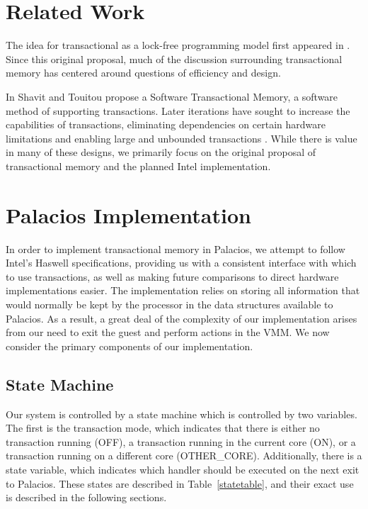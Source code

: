 \documentclass{acm_proc_article-sp}
\begin{document}
\section{Related Work}

The idea for transactional as a lock-free programming model first appeared in
 \cite{Herlihy:1993:TMA:173682.165164}. Since this original proposal, much of
the discussion surrounding transactional memory has centered around questions 
of efficiency and design.

In \cite{Shavit:1995:STM:224964.224987} Shavit and Touitou propose a Software
Transactional Memory, a software method of supporting transactions. Later 
iterations have sought to increase the capabilities of transactions, 
eliminating dependencies on certain hardware limitations and enabling 
large and unbounded transactions 
\cite{Ananian:2006:UTM:1116644.1116670, Hammond:2004:TMC:1028176.1006711,
Rajwar:2005:VTM:1080695.1070011}. While there is value in many of these 
designs, we primarily focus on the original proposal of transactional memory
and the planned Intel implementation.  

\section{Palacios Implementation}
In order to implement transactional memory in Palacios, we attempt to follow 
Intel's Haswell specifications, providing us with a consistent interface with which
to use transactions, as well as making future comparisons to direct hardware
implementations easier. The implementation relies on storing all information
that would normally be kept by the processor in the data structures available
to Palacios. As a result, a great deal of the complexity of our implementation
arises from our need to exit the guest and perform actions in the VMM. We now
consider the primary components of our implementation.

\subsection{State Machine}

Our system is controlled by a state machine which is controlled by two
variables. The first is the transaction mode, which indicates that there is 
either no transaction running (OFF), a transaction running in the current 
core (ON), or a transaction running on a different core (OTHER\_CORE). 
Additionally, there is a state variable, which indicates which handler should
be executed on the next exit to Palacios. These states are described in 
Table~\ref{statetable}, and their exact use is described in the following
sections.
\end{document}
